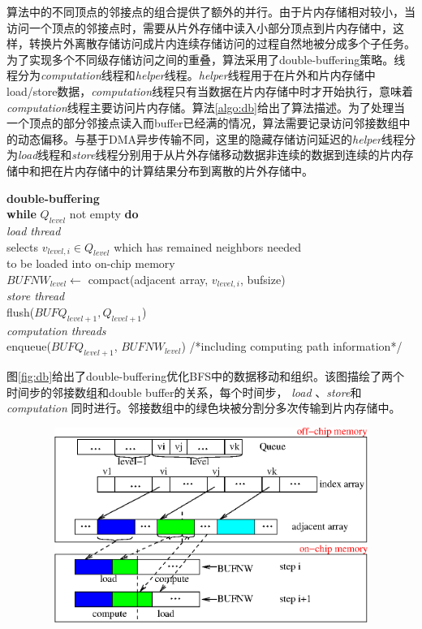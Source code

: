 \begin{flushleft}
算法中的不同顶点的邻接点的组合提供了额外的并行。由于片内存储相对较小，当访问一个顶点的邻接点时，需要从片外存储中读入小部分顶点到片内存储中，这样，转换片外离散存储访问成片内连续存储访问的过程自然地被分成多个子任务。为了实现多个不同级存储访问之间的重叠，算法采用了double-buffering策略。线程分为{\em computation}线程和{\em helper}线程。{\em helper}线程用于在片外和片内存储中load/store数据，{\em computation}线程只有当数据在片内存储中时才开始执行，意味着{\em computation}线程主要访问片内存储。算法\ref{algo:db}给出了算法描述。为了处理当一个顶点的部分邻接点读入而buffer已经满的情况，算法需要记录访问邻接数组中的动态偏移。与基于DMA异步传输不同，这里的隐藏存储访问延迟的{\em helper}线程分为{\em load}线程和{\em store}线程分别用于从片外存储移动数据非连续的数据到连续的片内存储中和把在片内存储中的计算结果分布到离散的片外存储中。
\begin{algorithm}\label{algo:db}
	{\bf double-buffering}\\
	{\bf while} $Q_{level}$ not empty {\bf do}\\
	\hspace*{1pc}{\bf if} {\it load thread} \\
	\hspace*{2pc}selects $v_{level, i} \in Q_{level}$ which has remained neighbors needed\\
	\hspace*{2pc}to be loaded into on-chip memory\\
	\hspace*{2pc}$BUFNW_{level}\leftarrow$ compact(adjacent array, $v_{level, i}$, bufsize)\\
	\hspace*{1pc}{\bf else if} {\it store thread} \\
	\hspace*{2pc}flush($BUFQ_{level+1}, Q_{level+1}$)\\
	\hspace*{1pc}{\bf else if} {\it computation threads} \\
	\hspace*{2pc}enqueue($BUFQ_{level+1}$, $BUFNW_{level}$)
	/*including computing path information*/
\end{algorithm}
图\ref{fig:db}给出了double-buffering优化BFS中的数据移动和组织。该图描绘了两个时间步的邻接数组和double buffer的关系，每个时间步， {\em load} 、{\em store}和{\em computation} 同时进行。邻接数组中的绿色块被分割分多次传输到片内存储中。
\begin{figure}[!htbp]
	\begin{center}
		\includegraphics[width=5in,height=2.5in]{Img/Chap_Algorithm/db}

\end{center}
\end{figure}
\end{flushleft}
